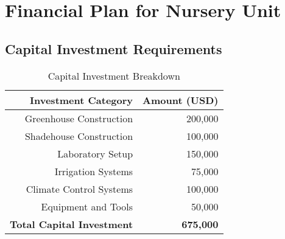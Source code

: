 \section{Financial Plan for Nursery Unit}

\subsection{Capital Investment Requirements}

\begin{table}[h]
\centering
\begin{tabular}{|r|r|}
\hline
\textbf{Investment Category} & \textbf{Amount (USD)} \\
\hline
Greenhouse Construction & 200,000 \\
Shadehouse Construction & 100,000 \\
Laboratory Setup & 150,000 \\
Irrigation Systems & 75,000 \\
Climate Control Systems & 100,000 \\
Equipment and Tools & 50,000 \\
\hline
\textbf{Total Capital Investment} & \textbf{675,000} \\
\hline
\end{tabular}
\caption{Capital Investment Breakdown}
\end{table}

